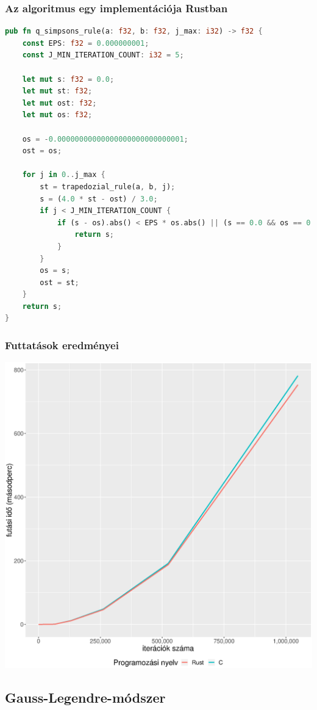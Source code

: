 \subsubsection{Az algoritmus egy implementációja Rustban}
\begin{lstlisting}[language=Rust]
pub fn q_simpsons_rule(a: f32, b: f32, j_max: i32) -> f32 {
    const EPS: f32 = 0.000000001;
    const J_MIN_ITERATION_COUNT: i32 = 5;

    let mut s: f32 = 0.0;
    let mut st: f32;
    let mut ost: f32;
    let mut os: f32;

    os = -0.00000000000000000000000000001;
    ost = os;

    for j in 0..j_max {
        st = trapedozial_rule(a, b, j);
        s = (4.0 * st - ost) / 3.0;
        if j < J_MIN_ITERATION_COUNT {
            if (s - os).abs() < EPS * os.abs() || (s == 0.0 && os == 0.0) {
                return s;
            }
        }
        os = s;
        ost = st;
    }
    return s;
}
\end{lstlisting}
\subsubsection{Futtatások eredményei}
\includegraphics[width=15.5cm]{kepek/simpsons_rule_run.eps}
\subsection{Gauss-Legendre-módszer}

